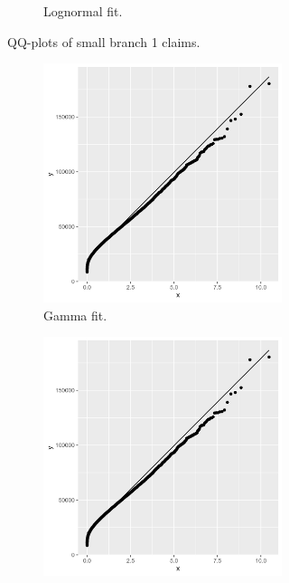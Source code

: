 \documentclass[11pt]{article}
\begin{document}
\begin{figure}[!h]
\begin{subfigure}{.49\textwidth}
\begin{subfigure}{.5\textwidth}
      \caption{Lognormal fit.}
    \end{subfigure}
    \caption{QQ-plots of small branch 1 claims.}
\end{subfigure}
\begin{subfigure}{.49\textwidth}
    \begin{subfigure}{.5\textwidth}
      \centering
      \includegraphics[width=.9\linewidth]{plots/claim_type2/qqplot_gamma_small.png}
      \caption{Gamma fit.}
    \end{subfigure}%
    \begin{subfigure}{.5\textwidth}
      \centering
      \includegraphics[width=.9\linewidth]{plots/claim_type2/qqplot_weibull_small.png}

\end{subfigure}
\end{subfigure}
\end{figure}
\end{document}

